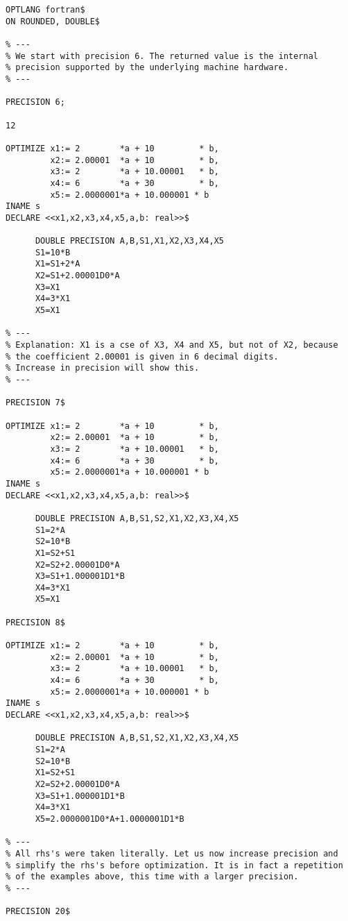 \example\label{ex:6.2}
{\small
\begin{verbatim}
OPTLANG fortran$
ON ROUNDED, DOUBLE$

% ---
% We start with precision 6. The returned value is the internal
% precision supported by the underlying machine hardware.
% ---

PRECISION 6;

12

OPTIMIZE x1:= 2        *a + 10         * b,
         x2:= 2.00001  *a + 10         * b,
         x3:= 2        *a + 10.00001   * b,
         x4:= 6        *a + 30         * b,
         x5:= 2.0000001*a + 10.000001 * b
INAME s
DECLARE <<x1,x2,x3,x4,x5,a,b: real>>$

      DOUBLE PRECISION A,B,S1,X1,X2,X3,X4,X5
      S1=10*B
      X1=S1+2*A
      X2=S1+2.00001D0*A
      X3=X1
      X4=3*X1
      X5=X1

% ---
% Explanation: X1 is a cse of X3, X4 and X5, but not of X2, because
% the coefficient 2.00001 is given in 6 decimal digits. 
% Increase in precision will show this.
% ---

PRECISION 7$

OPTIMIZE x1:= 2        *a + 10         * b,
         x2:= 2.00001  *a + 10         * b,
         x3:= 2        *a + 10.00001   * b,
         x4:= 6        *a + 30         * b,
         x5:= 2.0000001*a + 10.000001 * b
INAME s
DECLARE <<x1,x2,x3,x4,x5,a,b: real>>$

      DOUBLE PRECISION A,B,S1,S2,X1,X2,X3,X4,X5
      S1=2*A
      S2=10*B
      X1=S2+S1
      X2=S2+2.00001D0*A
      X3=S1+1.000001D1*B
      X4=3*X1
      X5=X1

PRECISION 8$

OPTIMIZE x1:= 2        *a + 10         * b,
         x2:= 2.00001  *a + 10         * b,
         x3:= 2        *a + 10.00001   * b,
         x4:= 6        *a + 30         * b,
         x5:= 2.0000001*a + 10.000001 * b
INAME s
DECLARE <<x1,x2,x3,x4,x5,a,b: real>>$

      DOUBLE PRECISION A,B,S1,S2,X1,X2,X3,X4,X5
      S1=2*A
      S2=10*B
      X1=S2+S1
      X2=S2+2.00001D0*A
      X3=S1+1.000001D1*B
      X4=3*X1
      X5=2.0000001D0*A+1.0000001D1*B

% ---
% All rhs's were taken literally. Let us now increase precision and
% simplify the rhs's before optimization. It is in fact a repetition
% of the examples above, this time with a larger precision.
% ---

PRECISION 20$


\end{verbatim}}
